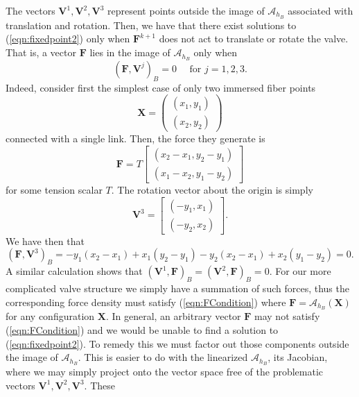 \documentclass[preprint,12pt]{elsarticle}
\begin{document}
The vectors $\mathbf{V}^1,\mathbf{V}^2,\mathbf{V}^3$ represent points outside the image of $\mathcal{A}_{h_B}$ associated with translation and rotation. Then, 
we have that there exist solutions to (\ref{eqn:fixedpoint2}) only when $\mathbf{F}^{k+1}$ does not act to translate or rotate the valve. That is, a vector $\mathbf{F}$ lies in the image of $\mathcal{A}_{h_B}$ only when 
\begin{equation}
( \mathbf{F}, \mathbf{V}^j )_B = 0 \quad
\textrm{ for } j=1,2,3.
\label{eqn:FCondition}
\end{equation}
Indeed, consider first the simplest case of only two immersed fiber points
\begin{equation}
\mathbf{X}=
\left( \begin{array}{c}
(x_1,y_1)\\
(x_2,y_2)
\end{array} \right)
\end{equation}
connected with a single link. Then,  the force they generate is
\begin{equation}
\mathbf{F}=T
\left[ \begin{array}{c}
(x_2-x_1,y_2-y_1)\\
(x_1-x_2,y_1-y_2)
\end{array} \right]
\end{equation}
for some tension scalar $T$.
The rotation vector about the origin is simply 
\begin{equation}
\mathbf{V}^3=
\left[ \begin{array}{c}
(-y_1,x_1)\\
(-y_2,x_2)
\end{array} \right].
\end{equation}
We have then that
\begin{equation}
( \mathbf{F},\mathbf{V}^3 )_B =
-y_1(x_2-x_1) + x_1(y_2-y_1) - y_2(x_2-x_1) + x_2(y_1-y_2) = 0.
\end{equation}
A similar calculation shows that $( \mathbf{V}^1,\mathbf{F} )_B = ( \mathbf{V}^2,\mathbf{F} )_B = 0$.
For our more complicated valve structure  we simply have a summation of such forces, thus the
corresponding  force density must satisfy (\ref{eqn:FCondition}) where 
$\mathbf{F}=\mathcal{A}_{h_B}(\mathbf{X})$ for any configuration $\mathbf{X}$. In general, an arbitrary vector $\mathbf{F}$ may not satisfy (\ref{eqn:FCondition}) and we would be unable to find a solution to (\ref{eqn:fixedpoint2}). To remedy this we must factor out those components  outside the image of $\mathcal{A}_{h_B}$. This is easier to do with the linearized $\mathcal{A}_{h_B}$, its Jacobian, where we may simply project onto the vector space free of the problematic vectors $\mathbf{V}^1,\mathbf{V}^2,\mathbf{V}^3$. These 
\end{document}
